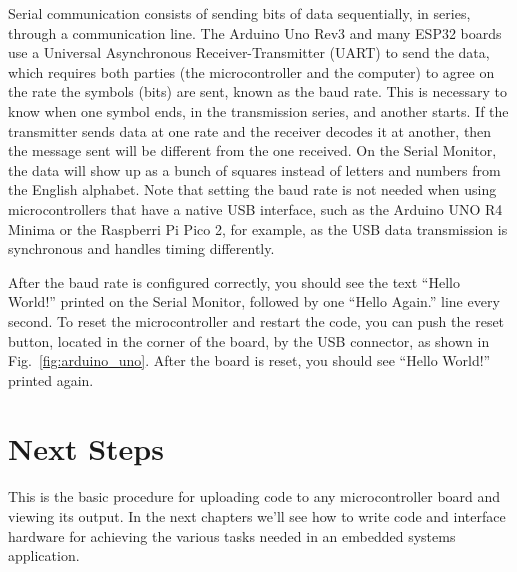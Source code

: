 Serial communication consists of sending bits of data sequentially, in series, through a communication line.
The Arduino Uno Rev3 and many ESP32 boards use a Universal Asynchronous Receiver-Transmitter (UART) to send the data, which requires both parties (the microcontroller and the computer) to agree on the rate the symbols (bits) are sent, known as the baud rate.
This is necessary to know when one symbol ends, in the transmission series, and another starts.
If the transmitter sends data at one rate and the receiver decodes it at another, then the message sent will be different from the one received.
On the Serial Monitor, the data will show up as a bunch of squares instead of letters and numbers from the English alphabet.
Note that setting the baud rate is not needed when using microcontrollers that have a native USB interface, such as the Arduino UNO R4 Minima or the Raspberri Pi Pico 2, for example, as the USB data transmission is synchronous and handles timing differently.

After the baud rate is configured correctly, you should see the text ``Hello World!'' printed on the Serial Monitor, followed by one ``Hello Again.'' line every second.
To reset the microcontroller and restart the code, you can push the reset button, located in the corner of the board, by the USB connector, as shown in Fig.~\ref{fig:arduino_uno}.
After the board is reset, you should see ``Hello World!'' printed again.

\section{Next Steps}

This is the basic procedure for uploading code to any microcontroller board and viewing its output.
In the next chapters we'll see how to write code and interface hardware for achieving the various tasks needed in an embedded systems application.

